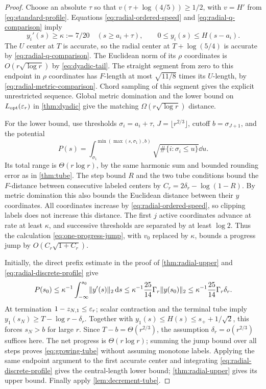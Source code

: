 \begin{proof}
Choose an absolute $\tau$ so that
$v(\tau+\log(4/5))\geq1/2$, with $v=H'$ from \eqref{eq:standard-profile}.
Equations \eqref{eq:radial-ordered-speed} and
\eqref{eq:radial-q-comparison} imply
\begin{equation}
 y_i'(s)\geq\kappa:=7/20\quad(s\geq a_i+\tau),
 \qquad 0\leq y_i(s)\leq H(s-a_i).
 \label{eq:radial-discrete-profile}
\end{equation}
The $U$ center at $T$ is accurate, so the radial center at
$T+\log(5/4)$ is accurate by \eqref{eq:radial-q-comparison}.
The Euclidean norm of its $\rho$ coordinates is $O(r\sqrt{\log r})$ by
\eqref{eq:dyadic-tail}. The straight segment from zero to this
endpoint in $\rho$ coordinates has $F$-length at most
$\sqrt{11/8}$ times its $U$-length, by
\eqref{eq:radial-metric-comparison}. Chord sampling of this segment
gives the explicit unrestricted sequence. Global metric domination and
the lower bound on $L_{\mathrm{opt}}(\varepsilon_r)$ in \cref{thm:dyadic}
give the matching $\Omega(r\sqrt{\log r})$ distance.

For the lower bound, use thresholds $\sigma_i=a_i+\tau$,
$J=\lfloor r^{2/3}\rfloor$, cutoff $b=\sigma_{J+1}$, and
the potential
\[
 P(s)=\int_{\sigma_1}^{\min(\max(s,\sigma_1),b)}
       \sqrt{\#\{i:\sigma_i\leq u\}}\dd u.
\]
Its total range is $\Theta(r\log r)$, by the same harmonic
sum and bounded rounding error as in \cref{thm:tube}.
The step bound $R$ and the two tube conditions bound the $F$-distance
between consecutive labeled centers by $C_r=2\delta_r-\log(1-R)$.
By metric domination this also bounds the Euclidean distance
between their $y$ coordinates. All coordinates increase by
\eqref{eq:radial-ordered-speed}, so clipping labels does not
increase this distance. The first $j$ active coordinates advance
at rate at least $\kappa$, and successive thresholds
are separated by at least $\log2$. Thus the calculation
\eqref{eq:one-progress-jump}, with $v_0$ replaced by $\kappa$,
bounds a progress jump by $O(C_r\sqrt{1+C_r})$.

Initially, the direct prefix estimate in the proof of
\cref{thm:radial-upper} and \eqref{eq:radial-discrete-profile}
give
\[
 P(s_0)\leq\kappa^{-1}\int_{-\infty}^{s_0}\lVert y'(s)\rVert_2\,\mathrm d s
 \leq\kappa^{-1}\frac{25}{14}\Gamma_r\lVert y(s_0)\rVert_2
 \leq\kappa^{-1}\frac{25}{14}\Gamma_r\delta_r.
\]
At termination $1-z_{N,1}\leq\varepsilon_r$; scalar contraction and
the terminal tube imply
$y_1(s_N)\geq T-\log r-\delta_r$.
Together with $y_1(s)\leq H(s)\leq s_++1/\sqrt2$, this
forces $s_N>b$ for large $r$. Since
$T-b=\Theta(r^{2/3})$, the assumption $\delta_r=o(r^{2/3})$
suffices here.
The net progress is $\Theta(r\log r)$; summing the jump bound over
all steps proves \eqref{eq:growing-tube} without assuming monotone
labels.
Applying the same endpoint argument to the first accurate center
and integrating \eqref{eq:radial-discrete-profile} gives the
central-length lower bound; \cref{thm:radial-upper} gives its
upper bound. Finally apply \cref{lem:decrement-tube}.
\end{proof}

